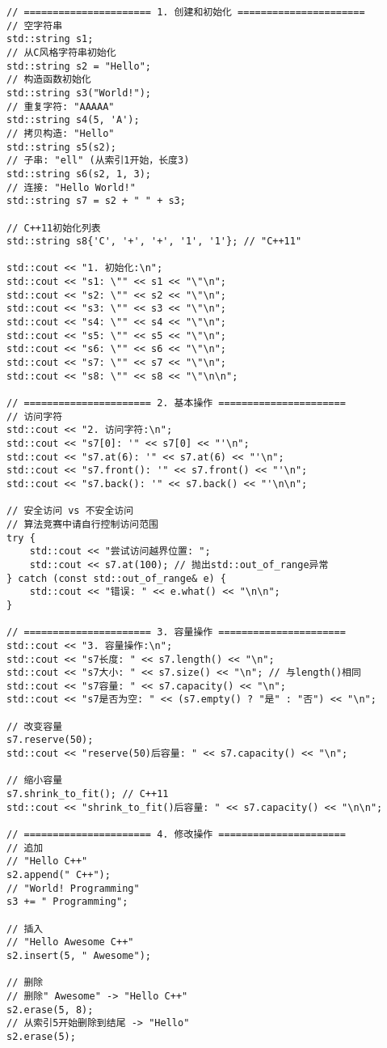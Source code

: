 \begin{lstlisting}
// ====================== 1. 创建和初始化 ======================
// 空字符串
std::string s1;
// 从C风格字符串初始化
std::string s2 = "Hello";
// 构造函数初始化
std::string s3("World!");
// 重复字符: "AAAAA"
std::string s4(5, 'A');
// 拷贝构造: "Hello"
std::string s5(s2);
// 子串: "ell" (从索引1开始，长度3)
std::string s6(s2, 1, 3);
// 连接: "Hello World!"
std::string s7 = s2 + " " + s3;

// C++11初始化列表
std::string s8{'C', '+', '+', '1', '1'}; // "C++11"

std::cout << "1. 初始化:\n";
std::cout << "s1: \"" << s1 << "\"\n";
std::cout << "s2: \"" << s2 << "\"\n";
std::cout << "s3: \"" << s3 << "\"\n";
std::cout << "s4: \"" << s4 << "\"\n";
std::cout << "s5: \"" << s5 << "\"\n";
std::cout << "s6: \"" << s6 << "\"\n";
std::cout << "s7: \"" << s7 << "\"\n";
std::cout << "s8: \"" << s8 << "\"\n\n";

// ====================== 2. 基本操作 ======================
// 访问字符
std::cout << "2. 访问字符:\n";
std::cout << "s7[0]: '" << s7[0] << "'\n";
std::cout << "s7.at(6): '" << s7.at(6) << "'\n";
std::cout << "s7.front(): '" << s7.front() << "'\n";
std::cout << "s7.back(): '" << s7.back() << "'\n\n";

// 安全访问 vs 不安全访问
// 算法竞赛中请自行控制访问范围
try {
    std::cout << "尝试访问越界位置: ";
    std::cout << s7.at(100); // 抛出std::out_of_range异常
} catch (const std::out_of_range& e) {
    std::cout << "错误: " << e.what() << "\n\n";
}

// ====================== 3. 容量操作 ======================
std::cout << "3. 容量操作:\n";
std::cout << "s7长度: " << s7.length() << "\n";
std::cout << "s7大小: " << s7.size() << "\n"; // 与length()相同
std::cout << "s7容量: " << s7.capacity() << "\n";
std::cout << "s7是否为空: " << (s7.empty() ? "是" : "否") << "\n";

// 改变容量
s7.reserve(50);
std::cout << "reserve(50)后容量: " << s7.capacity() << "\n";

// 缩小容量
s7.shrink_to_fit(); // C++11
std::cout << "shrink_to_fit()后容量: " << s7.capacity() << "\n\n";

// ====================== 4. 修改操作 ======================
// 追加
// "Hello C++"
s2.append(" C++");
// "World! Programming"
s3 += " Programming";

// 插入
// "Hello Awesome C++"
s2.insert(5, " Awesome"); 

// 删除
// 删除" Awesome" -> "Hello C++"
s2.erase(5, 8);
// 从索引5开始删除到结尾 -> "Hello"
s2.erase(5);


\end{lstlisting}
